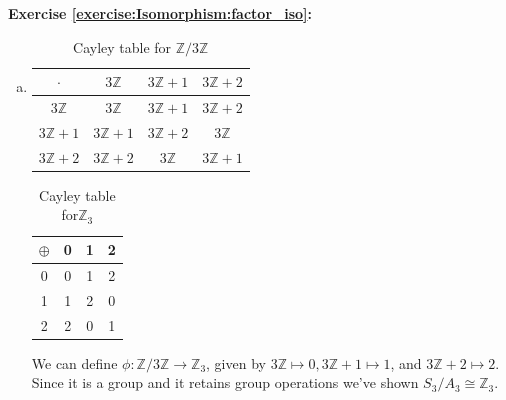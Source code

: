 \noindent\textbf{Exercise \ref{exercise:Isomorphism:factor_iso}:}
\begin{enumerate}[(a)]
\item
\begin{multicols}{2}
\begin{table}[H]
\caption{Cayley table for ${\mathbb Z}/ 3 {\mathbb Z}$}
{\small
\begin{center}
\begin{tabular}{c|ccc}
$\cdot$ & $ 3 {\mathbb Z}$ & $ 3 {\mathbb Z} + 1$ & $ 3 {\mathbb Z} + 2$ \\
\hline
$ 3 {\mathbb Z}$ & $ 3 {\mathbb Z}$ & $ 3 {\mathbb Z} + 1$ & $ 3 {\mathbb Z} + 2 $  \\
$ 3 {\mathbb Z} + 1$  & $ 3 {\mathbb Z} + 1$  & $ 3 {\mathbb Z} + 2$ &  $3 {\mathbb Z}$   \\
$ 3 {\mathbb Z} + 2$  & $ 3 {\mathbb Z} + 2$ & $ 3 {\mathbb Z}$ & $ 3 {\mathbb Z} + 1$ \\
\end{tabular}
\end{center}
}
\end{table}

\begin{table}[H]
\caption{Cayley table for${\mathbb Z}_3$}
{\small
\begin{center}
\begin{tabular}{c|ccc}
$\oplus$ & 0 & 1  & 2\\

\hline
0 & 0 & 1  & 2\\ 
1& 1 & 2 & 0\\
2 & 2 & 0 & 1\\
\end{tabular}
\end{center}
}
\end{table}
\end{multicols}
We can define $\phi:{\mathbb Z}/ 3 {\mathbb Z} \rightarrow {\mathbb Z}_3$,  given by  $3 {\mathbb Z} \mapsto 0,  3 {\mathbb Z} + 1 \mapsto 1$, and $3 {\mathbb Z} + 2 \mapsto 2$. Since it is a group and it retains group operations we've shown $S_3/A_3 \cong {\mathbb Z}_3$.

\end{enumerate}

